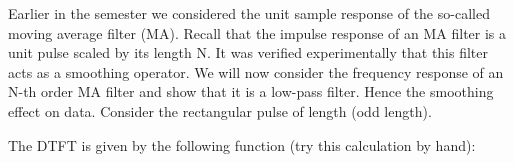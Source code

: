\documentclass{article}
\begin{document}
\begin{CellGroup}


Earlier in the semester we considered the unit sample response of the  so-called moving average filter (MA). Recall that the impulse response of
an MA filter is a unit pulse scaled by its length N. It was verified experimentally that this filter acts as a smoothing operator. We will now consider
the frequency response of an N-th order MA filter and show that it is a low-pass filter. Hence the smoothing effect on data. Consider the rectangular
pulse of length  (odd length). 



\begin{CellGroup}

\end{CellGroup}
\begin{CellGroup}
The DTFT is given by the following function (try this calculation by hand):

\begin{CellGroup}

\end{CellGroup}
\begin{CellGroup}


\end{CellGroup}
\end{CellGroup}
\end{CellGroup}
\end{document}
